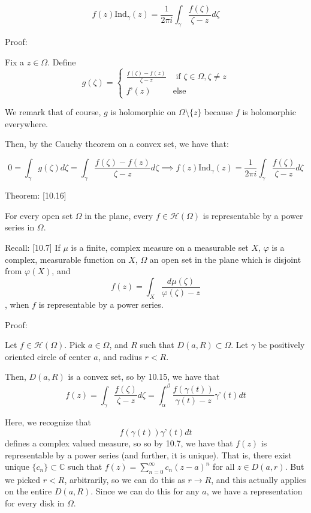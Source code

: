 \documentclass[10pt]{article}
\begin{document}
$$f(z) \text{Ind}_\gamma(z) = \frac{1}{2\pi i} \int_\gamma \frac{f(\zeta)}{\zeta - z} d\zeta $$

Proof:

Fix a $z \in \Omega$. Define $$g(\zeta) = \begin{cases} \frac{f(\zeta) - f(z)}{\zeta - z} & \text{ if } \zeta \in \Omega, \zeta \not = z \\ f’(z) & \text{else} \end{cases}$$

We remark that of course, $g$ is holomorphic on $\Omega \setminus \{ z \}$ because $f$ is holomorphic everywhere. 

Then, by the Cauchy theorem on a convex set, we have that:

$$  0 = \int_\gamma g(\zeta) d\zeta = \int_\gamma \frac{f(\zeta) - f(z)}{\zeta - z}  d\zeta \implies f(z) \text{Ind}_\gamma(z) = \frac{1}{2\pi i} \int_\gamma \frac{f(\zeta)}{\zeta - z} d\zeta $$

Theorem: [10.16]

For every open set $\Omega$ in the plane, every $f \in \mathcal{H}(\Omega)$ is representable by a power series in $\Omega$. 

Recall: [10.7] If $\mu$ is a finite, complex measure on a measurable set $X$, $\varphi$ is a complex, measurable function on $X$, $\Omega$ an open set in the plane which is disjoint from $\varphi(X)$, and $$ f(z) = \int_X \frac{d\mu(\zeta)}{\varphi(\zeta) - z}$$, when $f$ is representable by a power series.

Proof:

Let $f \in \mathcal{H}(\Omega)$. Pick $ a \in \Omega$, and $R$ such that $D(a, R) \subset \Omega$. Let $\gamma$ be positively oriented circle of center $a$, and radius $r < R$. 

Then, $D(a,R)$ is a convex set, so by 10.15, we have that $$f(z) = \int_\gamma \frac{f(\zeta)}{\zeta - z} d\zeta = \int_\alpha^\beta \frac{f(\gamma(t))}{\gamma(t) - z} \gamma’(t) dt $$

Here, we recognize that $$ f(\gamma(t)) \gamma’(t)dt$$ defines a complex valued measure, so so by 10.7, we have that $f(z)$ is representable by a power series (and further, it is unique). That is, there exist unique $\{ c_n \} \subset \mathbb{C}$ such that $f(z) = \sum_{n=0}^\infty c_n (z -a)^n$ for all $z \in D(a,r)$. But we picked $r < R$, arbitrarily, so we can do this as $r \to R$, and this actually applies on the entire $D(a,R)$. Since we can do this for any $a$, we have a representation for every disk in $\Omega$. 
\end{document}
